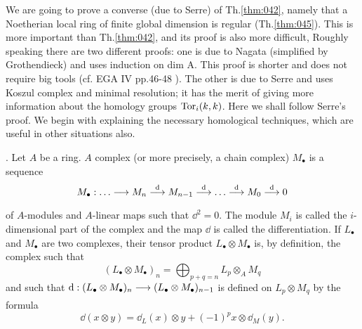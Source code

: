 \documentclass[../main]{subfiles}
\begin{document}
We are going to prove a converse (due to Serre) of Th.\ref{thm:042}, namely that a Noetherian local ring of finite global dimension is regular (Th.\ref{thm:045}). This is more important than Th.\ref{thm:042}, and its proof is also more difficult, Roughly speaking there are two different proofs: one is due to Nagata (simplified by Grothendieck) and uses induction on dim A. This proof is shorter and does not require big tools (cf. EGA IV pp.46-48 \cite{egaIV}). The other is due to Serre and uses Koszul complex and minimal resolution; it has the merit of giving more information about the homology groups $\operatorname{Tor}_{i}(k, k)$. Here we shall follow Serre's proof. We begin with explaining the necessary homological techniques, which are useful in other situations also.

\newparagraph {}. Let $A$ be a ring. $A$ complex (or more precisely, a chain complex) $M_\bullet$ is a sequence
\[
 M_\bullet : \dots \varrightarrow{} M_{n} \varrightarrow{\mathrm{d}} M_{n-1} \varrightarrow{\mathrm{d}} \dots \varrightarrow{\mathrm{d}} M_{0} \varrightarrow{\mathrm{d}} 0
\]
of $A$-modules and $A$-linear maps such that $\dd^{2}=0$. The module $M_i$ is called the $i$-dimensional part of the complex and the map $\dd$ is called the differentiation. If $L_\bullet$ and $M_\bullet$ are two complexes, their tensor product $L_\bullet\otimes M_\bullet$ is, by definition, the complex such that \[(L_\bullet \otimes M_\bullet)_{n}=\displaystyle\bigoplus_{p+q=n} L_{p} \otimes_{A} M_{q}\] and such that $\dd:(L_\bullet \otimes M_\bullet)_{n}\varrightarrow{}(L_\bullet \otimes M_\bullet)_{n-1}$ is defined on $L_{p} \otimes M_{q}$ by the formula \[\dd(x \otimes y)=\dd_{L}(x) \otimes y+(-1)^{p} x \otimes \dd_{M}(y).\]
\end{document}
